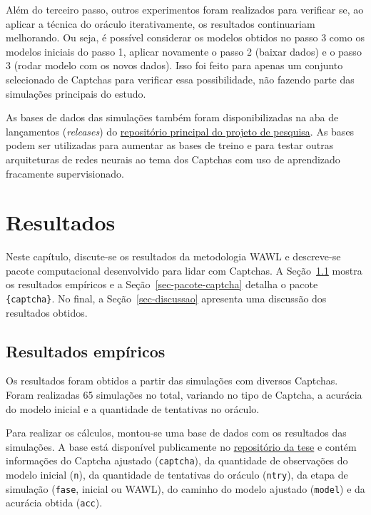 \documentclass[12pt,twoside,brazilian]{book}
\begin{document}
Além do terceiro passo, outros experimentos foram realizados para
verificar se, ao aplicar a técnica do oráculo iterativamente, os
resultados continuariam melhorando. Ou seja, é possível considerar os
modelos obtidos no passo 3 como os modelos iniciais do passo 1, aplicar
novamente o passo 2 (baixar dados) e o passo 3 (rodar modelo com os
novos dados). Isso foi feito para apenas um conjunto selecionado de
Captchas para verificar essa possibilidade, não fazendo parte das
simulações principais do estudo.

As bases de dados das simulações também foram disponibilizadas na aba de
lançamentos (\emph{releases}) do
\href{https://github.com/jtrecenti/doutorado/releases}{repositório
principal do projeto de pesquisa}. As bases podem ser utilizadas para
aumentar as bases de treino e para testar outras arquiteturas de redes
neurais ao tema dos Captchas com uso de aprendizado fracamente
supervisionado.


\hypertarget{sec-results}{%
\chapter{Resultados}\label{sec-results}}


Neste capítulo, discute-se os resultados da metodologia WAWL e
descreve-se pacote computacional desenvolvido para lidar com Captchas. A
Seção~\ref{sec-result-sim} mostra os resultados empíricos e a
Seção~\ref{sec-pacote-captcha} detalha o pacote \texttt{\{captcha\}}. No
final, a Seção~\ref{sec-discussao} apresenta uma discussão dos
resultados obtidos.

\hypertarget{sec-result-sim}{%
\section{Resultados empíricos}\label{sec-result-sim}}

Os resultados foram obtidos a partir das simulações com diversos
Captchas. Foram realizadas 65 simulações no total, variando no tipo de
Captcha, a acurácia do modelo inicial e a quantidade de tentativas no
oráculo.

Para realizar os cálculos, montou-se uma base de dados com os resultados
das simulações. A base está disponível publicamente no
\href{https://github.com/jtrecenti/doutorado}{repositório da tese} e
contém informações do Captcha ajustado (\texttt{captcha}), da quantidade
de observações do modelo inicial (\texttt{n}), da quantidade de
tentativas do oráculo (\texttt{ntry}), da etapa de simulação
(\texttt{fase}, inicial ou WAWL), do caminho do modelo ajustado
(\texttt{model}) e da acurácia obtida (\texttt{acc}).
\end{document}
